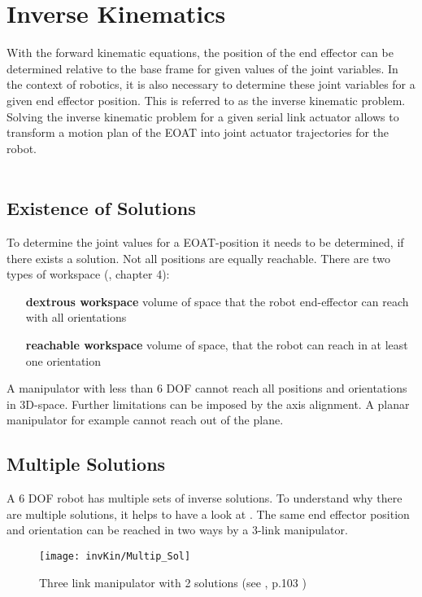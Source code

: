 \section{Inverse Kinematics}

With the forward kinematic equations, the position of the end effector can be determined relative to the base frame for given values of the joint variables.
In the context of robotics, it is also necessary to determine these joint variables for a given end effector position.
This is referred to as the inverse kinematic problem.
Solving the inverse kinematic problem for a given serial link actuator allows to transform a motion plan of the \ac{EOAT} into joint actuator trajectories for the robot.\\
\\
\subsection{Existence of Solutions} \label{sec:ExistSol}
To determine the joint values for a \ac{EOAT}-position it needs to be determined, if there exists a solution.
Not all positions are equally reachable.
There are two types of workspace (\cite{craig1986introduction}, chapter 4):%
\begin{itemize}[wide=\parindent] 
	\item[\textbf{dextrous workspace}] volume of space that the robot end-effector can reach with all orientations
	\item[\textbf{reachable workspace}] volume of space, that the robot can reach in at least one orientation
\end{itemize}


A manipulator with less than 6 \ac{DOF} cannot reach all positions and orientations in 3D-space. Further limitations can be imposed by the axis alignment. A planar manipulator for example cannot reach  out of the plane. \cite{craig1986introduction}

\subsection{Multiple Solutions} \label{MultipSol}
A 6 \ac{DOF} robot has multiple sets of inverse solutions. To understand why there are multiple solutions, it helps to have a look at  . The same end effector position and orientation can be reached in two ways by a 3-link manipulator. 

\begin{figure}[H]
	\texttt{[image: invKin/Multip\_Sol]}
	\caption{Three link manipulator with 2 solutions (see \cite{craig1986introduction}, p.103 )}
	\label{fig:multipSol3Link}
\end{figure}

